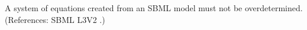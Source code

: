 A system of equations created from an SBML model must not be
overdetermined.  (References: SBML L3V2 .)
